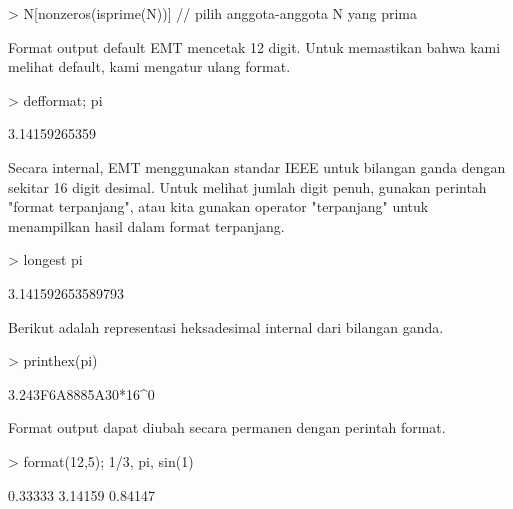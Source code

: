 \documentclass[a4paper,10pt]{article}
\begin{document}
\begin{eulernotebook}
\begin{eulercomment}
\begin{eulercomment}
\begin{euleroutput}
\end{euleroutput}
\begin{eulerprompt}
> N[nonzeros(isprime(N))] // pilih anggota-anggota N yang prima
\end{eulerprompt}
\begin{euleroutput}
  [2,  3,  5,  7,  11,  13,  17,  19,  23,  29,  31,  37,  41,  43,  47,
  53,  59,  61,  67,  71,  73,  79,  83,  89,  97]
\end{euleroutput}
\begin{eulercomment}
Format output default EMT mencetak 12 digit. Untuk memastikan bahwa
kami melihat default, kami mengatur ulang format.
\end{eulercomment}
\begin{eulerprompt}
> defformat; pi
\end{eulerprompt}
\begin{euleroutput}
  3.14159265359
\end{euleroutput}
\begin{eulercomment}
Secara internal, EMT menggunakan standar IEEE untuk bilangan ganda
dengan sekitar 16 digit desimal. Untuk melihat jumlah digit penuh,
gunakan perintah "format terpanjang", atau kita gunakan operator
"terpanjang" untuk menampilkan hasil dalam format terpanjang.
\end{eulercomment}
\begin{eulerprompt}
> longest pi
\end{eulerprompt}
\begin{euleroutput}
        3.141592653589793 
\end{euleroutput}
\begin{eulercomment}
Berikut adalah representasi heksadesimal internal dari bilangan ganda.
\end{eulercomment}
\begin{eulerprompt}
> printhex(pi)
\end{eulerprompt}
\begin{euleroutput}
  3.243F6A8885A30*16^0
\end{euleroutput}
\begin{eulercomment}
Format output dapat diubah secara permanen dengan perintah format.
\end{eulercomment}
\begin{eulerprompt}
> format(12,5); 1/3, pi, sin(1)
\end{eulerprompt}
\begin{euleroutput}
      0.33333 
      3.14159 
      0.84147 
\end{euleroutput}

\end{eulercomment}
\end{eulercomment}
\end{eulernotebook}
\end{document}
